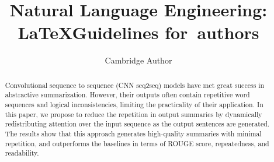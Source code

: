 \documentclass{nle}
\theoremstyle{definition}
\begin{document}
\label{firstpage}




\title{Natural Language Engineering: \LaTeX Guidelines for~authors}

\begin{authgrp}
\author{Cambridge Author}
\end{authgrp}


\begin{abstract}
Convolutional sequence to sequence (CNN seq2seq) models
have met great success in abstractive summarization. 
However, their outputs often contain repetitive word sequences and logical
inconsistencies, limiting the practicality of their application.
In this paper, we propose to reduce the repetition in output summaries
by dynamically redistributing attention over the input sequence as
the output sentences are generated.
The results show that this approach 
generates high-quality summaries with minimal repetition, 
and outperforms the baselines 
in terms of
ROUGE score, repeatedness, and readability.
\end{abstract}

\maketitle

%
%
%







\label{lastpage}
\end{document}
